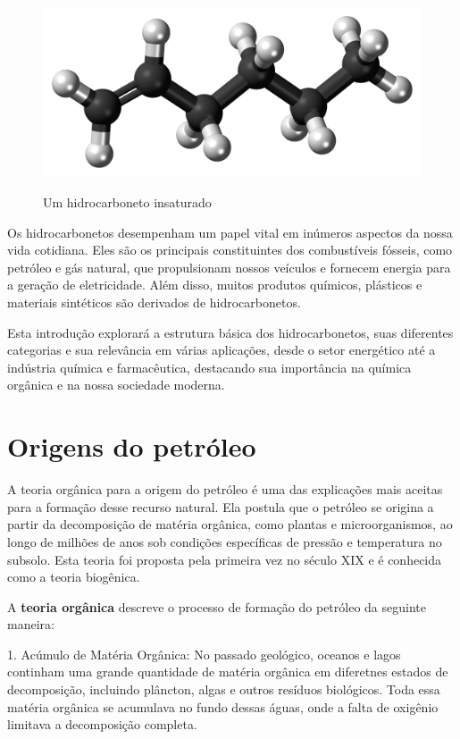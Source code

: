 \begin{figure}[h]\centering
\caption{Um hidrocarboneto insaturado}
\includegraphics[scale=0.225]{imagens/1-Hexene-3D-balls.png}
\label{fig:hexene}\vspace{0.5cm}\end{figure}

Os hidrocarbonetos desempenham um papel vital em inúmeros aspectos da nossa vida cotidiana. Eles são os principais constituintes dos combustíveis fósseis, como petróleo e gás natural, que propulsionam nossos veículos e fornecem energia para a geração de eletricidade. Além disso, muitos produtos químicos, plásticos e materiais sintéticos são derivados de hidrocarbonetos.

Esta introdução explorará a estrutura básica dos hidrocarbonetos, suas diferentes categorias e sua relevância em várias aplicações, desde o setor energético até a indústria química e farmacêutica, destacando sua importância na química orgânica e na nossa sociedade moderna.
\section{Origens do petróleo}
A teoria orgânica para a origem do petróleo é uma das explicações mais aceitas para a formação desse recurso natural. Ela postula que o petróleo se origina a partir da decomposição de matéria orgânica, como plantas e microorganismos, ao longo de milhões de anos sob condições específicas de pressão e temperatura no subsolo. Esta teoria foi proposta pela primeira vez no século XIX e é conhecida como a teoria biogênica.

A \textbf{teoria orgânica} descreve o processo de formação do petróleo da seguinte maneira:

1. Acúmulo de Matéria Orgânica: No passado geológico, oceanos e lagos continham uma grande quantidade de matéria orgânica em diferetnes estados de decomposição, incluindo plâncton, algas e outros resíduos biológicos. Toda essa matéria orgânica se acumulava no fundo dessas águas, onde a falta de oxigênio limitava a decomposição completa.

